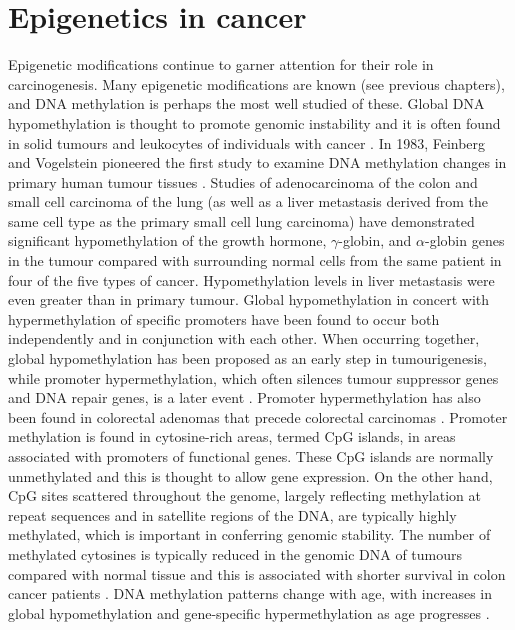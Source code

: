 \section[]{Epigenetics in cancer} %
\noindent Epigenetic modifications continue to garner attention for their role in carcinogenesis. Many epigenetic modifications are known (see previous chapters), and DNA methylation is perhaps the most well studied of these. Global DNA hypomethylation is thought to promote genomic instability and it is often found in solid tumours \cite{c215} and leukocytes of individuals with cancer \cite{c216,c217}. In 1983, Feinberg and Vogelstein pioneered the first study to examine DNA methylation changes in primary human tumour tissues \cite{c215}. Studies of adenocarcinoma of the colon and small cell carcinoma of the lung (as well as a liver metastasis derived from the same cell type as the primary small cell lung carcinoma) have demonstrated significant hypomethylation of the growth hormone, $\gamma$-globin, and $\alpha$-globin genes in the tumour compared with surrounding normal cells from the same patient in four of the five types of cancer. Hypomethylation levels in liver metastasis were even greater than in 
primary tumour. Global hypomethylation in concert with hypermethylation of specific promoters have been found to occur both independently and in conjunction with each other. When occurring together, global hypomethylation has been proposed as an early step in tumourigenesis, while promoter hypermethylation, which often silences tumour suppressor genes and DNA repair genes, is a later event \cite{c218}. Promoter hypermethylation has also been found in colorectal adenomas that precede colorectal carcinomas \cite{c219}. Promoter methylation is found in cytosine-rich areas, termed CpG islands, in areas associated with promoters of functional genes. These CpG islands are normally unmethylated and this is thought to allow gene expression. On the other hand, CpG sites scattered throughout the genome, largely reflecting methylation at repeat sequences and in satellite regions of the DNA, are typically highly methylated, which is important in conferring genomic stability. The number of methylated cytosines is 
typically reduced in the genomic DNA of tumours compared with normal tissue \cite{c220} and this is associated with shorter survival in colon cancer patients \cite{c221}. DNA methylation patterns change with age, with increases in global hypomethylation and gene-specific hypermethylation as age progresses \cite{c222,c223}. 
 
